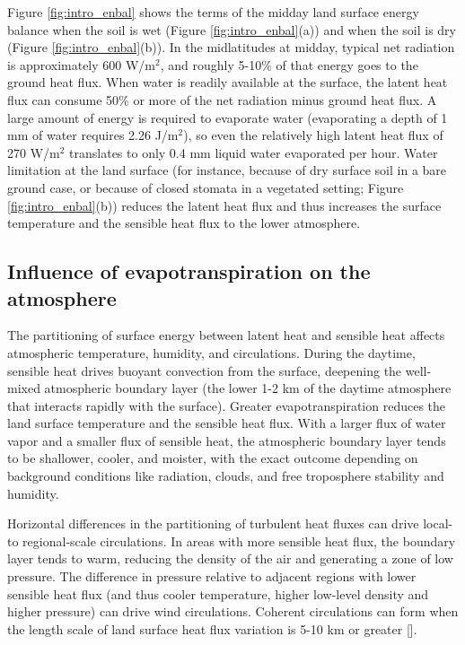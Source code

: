 Figure \ref{fig:intro_enbal} shows the terms of the midday land surface energy balance when the soil is wet (Figure \ref{fig:intro_enbal}(a)) and when the soil is dry (Figure \ref{fig:intro_enbal}(b)).  In the midlatitudes at midday, typical net radiation is approximately 600 W/m$^2$, and roughly 5-10\% of that energy goes to the ground heat flux.  When water is readily available at the surface, the latent heat flux can consume 50\% or more of the net radiation minus ground heat flux.  A large amount of energy is required to evaporate water (evaporating a depth of 1 mm of water requires 2.26 J/m$^2$), so even the relatively high latent heat flux of 270 W/m$^2$ translates to only 0.4 mm liquid water evaporated per hour.  Water limitation at the land surface (for instance, because of dry surface soil in a bare ground case, or because of closed stomata in a vegetated setting; Figure \ref{fig:intro_enbal}(b)) reduces the latent heat flux and thus increases the surface temperature and the sensible heat flux to the lower atmosphere.

\subsection{Influence of evapotranspiration on the atmosphere}

The partitioning of surface energy between latent heat and sensible heat affects atmospheric temperature, humidity, and circulations.  During the daytime, sensible heat drives buoyant convection from the surface, deepening the well-mixed atmospheric boundary layer (the lower 1-2 km of the daytime atmosphere that interacts rapidly with the surface).  Greater evapotranspiration reduces the land surface temperature and the sensible heat flux.  With a larger flux of water vapor and a smaller flux of sensible heat, the atmospheric boundary layer tends to be shallower, cooler, and moister, with the exact outcome depending on background conditions like radiation, clouds, and free troposphere stability and humidity.

Horizontal differences in the partitioning of turbulent heat fluxes can drive local- to regional-scale circulations.  In areas with more sensible heat flux, the boundary layer tends to warm, reducing the density of the air and generating a zone of low pressure.  The difference in pressure relative to adjacent regions with lower sensible heat flux (and thus cooler temperature, higher low-level density and higher pressure) can drive wind circulations.  Coherent circulations can form when the length scale of land surface heat flux variation is 5-10 km or greater [\cite{avissar1998evaluation}].

